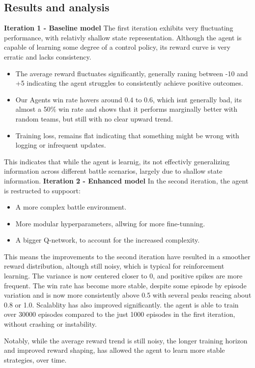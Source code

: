 \subsection{Results and analysis}
\textbf{Iteration 1 - Baseline model}
The first iteration exhibits very fluctuating performance, with relativly shallow 
state representation. Although the agent is capable of learning some degree of a control
policy, its reward curve is very erratic and lacks consistency.
\begin{itemize}
    \item The average reward fluctuates significantly, generally raning between -10 and +5
    indicating the agent struggles to consistently achieve positive outcomes.
    \item Our Agents win rate hovers around 0.4 to 0.6, which isnt generally bad, its almost a 50\% win rate
    and shows that it performs marginally better with random teams, but still with no clear upward trend.
    \item Training loss, remains flat indicating that something might be wrong with logging or infrequent updates.
\end{itemize}
This indicates that while the agent is learnig, its not effectivly generalizing 
information across different battle scenarios, largely due to shallow state information.
\newline
\textbf{Iteration 2 - Enhanced model}
In the second iteration, the agent is restructed to suppoort:
\begin{itemize}
    \item A more complex battle environment.
    \item More modular hyperparameters, allwing for more fine-tunning.
    \item A bigger Q-network, to account for the increased complexity.
\end{itemize}
This means the improvements to the second iteration have resulted in a smoother reward
distribution, altough still noisy, which is typical for reinforcement learning. The variance
is now centered closer to 0, and positive spikes are more frequent. The win rate 
has become more stable, despite some episode by episode variation 
and is now more consistently above 0.5 with several peaks reacing about 0.8 or 1.0.
Scalablity has also improved significantly. the agent is able to train over 30000 episodes
compared to the just 1000 episodes in the first iteration, without crashing or instability.

Notably, while the average reward trend is still noisy, the longer training horizon
and improved reward shaping, has allowed the agent to learn more stable strategies, over time.
